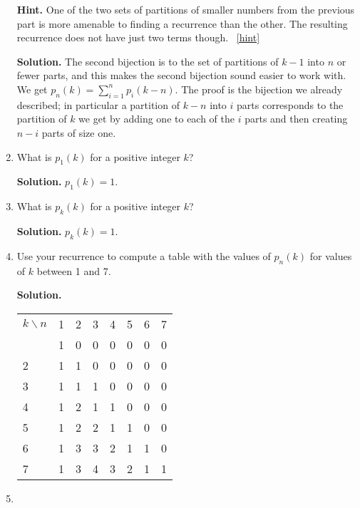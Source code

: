 \documentclass{book}
\begin{document}
\begin{activity}[]
\begin{enumerate}[font=\bfseries,label=(\alph*),ref=\alph*]
\par\smallskip%
\noindent\textbf{Hint.}\hypertarget{hint-137}{}\quad%
\hypertarget{p-1182}{}%
One of the two sets of partitions of smaller numbers from the previous part is more amenable to finding a recurrence than the other. The resulting recurrence does not have just two terms though.%
~\hfill{\tiny\hyperlink{a-215.d}{[hint]}\hypertarget{q-215.d}{}}\par\smallskip%
\noindent\textbf{Solution.}\hypertarget{solution-118}{}\quad%
\hypertarget{p-1183}{}%
The second bijection is to the set of partitions of \(k-1\) into \(n\) or fewer parts, and this makes the second bijection sound easier to work with. We get \(p_n(k)=\sum_{i=1}^n p_i(k-n)\). The proof is the bijection we already described; in particular a partition of \(k-n\) into \(i\) parts corresponds to the partition of \(k\) we get by adding one to each of the \(i\) parts and then creating \(n-i\) parts of size one.%
\item\label{task-224} \hypertarget{p-1184}{}%
What is \(p_1(k)\) for a positive integer \(k\)?%
\par\smallskip%
\noindent\textbf{Solution.}\hypertarget{solution-119}{}\quad%
\hypertarget{p-1185}{}%
\(p_1(k)=1\).%
\item\label{task-225} \hypertarget{p-1186}{}%
What is \(p_k(k)\) for a positive integer \(k\)?%
\par\smallskip%
\noindent\textbf{Solution.}\hypertarget{solution-120}{}\quad%
\hypertarget{p-1187}{}%
\(p_k(k)=1\).%
\item\label{task-226} \hypertarget{p-1188}{}%
Use your recurrence to compute a table with the values of \(p_n(k)\) for values of \(k\) between 1 and 7.%
\par\smallskip%
\noindent\textbf{Solution.}\hypertarget{solution-121}{}\quad%
\begin{sidebyside}{1}{0}{0}{0}
\begin{sbspanel}{1}
{\centering%
\begin{tabular}{llllllll}
\(k\backslash n\)&1&2&3&4&5&6&7\tabularnewline\hrulethin
1&1&0&0&0&0&0&0\tabularnewline[0pt]
2&1&1&0&0&0&0&0\tabularnewline[0pt]
3&1&1&1&0&0&0&0\tabularnewline[0pt]
4&1&2&1&1&0&0&0\tabularnewline[0pt]
5&1&2&2&1&1&0&0\tabularnewline[0pt]
6&1&3&3&2&1&1&0\tabularnewline[0pt]
7&1&3&4&3&2&1&1
\end{tabular}
\par}
\end{sbspanel}
\end{sidebyside}
\item\label{task-227} \hypertarget{p-1189}{}%

\end{enumerate}
\end{activity}
\end{document}
